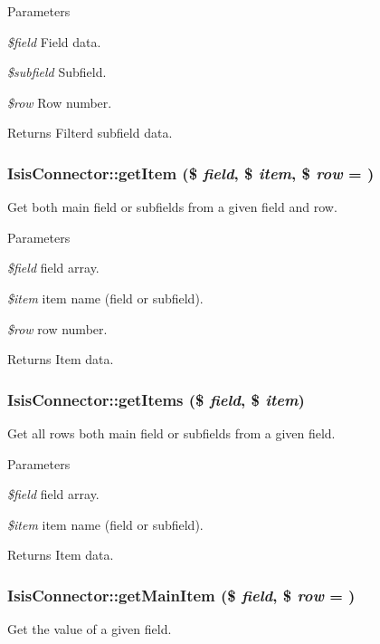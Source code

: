 \begin{DoxyParams}{Parameters}
\item[{\em \$field}]Field data.\item[{\em \$subfield}]Subfield.\item[{\em \$row}]Row number.\end{DoxyParams}
\begin{DoxyReturn}{Returns}
Filterd subfield data. 
\end{DoxyReturn}
\hypertarget{classIsisConnector_aa16bb24a54837048eee6244957cbf091}{
\subsubsection[{getItem}]{\setlength{\rightskip}{0pt plus 5cm}IsisConnector::getItem (\$ {\em field}, \/  \$ {\em item}, \/  \$ {\em row} = {})}}
\label{classIsisConnector_aa16bb24a54837048eee6244957cbf091}
Get both main field or subfields from a given field and row.


\begin{DoxyParams}{Parameters}
\item[{\em \$field}]field array.\item[{\em \$item}]item name (field or subfield).\item[{\em \$row}]row number.\end{DoxyParams}
\begin{DoxyReturn}{Returns}
Item data. 
\end{DoxyReturn}
\hypertarget{classIsisConnector_aa928456a26e0264bf0c1a4869a02cbb3}{
\subsubsection[{getItems}]{\setlength{\rightskip}{0pt plus 5cm}IsisConnector::getItems (\$ {\em field}, \/  \$ {\em item})}}
\label{classIsisConnector_aa928456a26e0264bf0c1a4869a02cbb3}
Get all rows both main field or subfields from a given field.


\begin{DoxyParams}{Parameters}
\item[{\em \$field}]field array.\item[{\em \$item}]item name (field or subfield).\end{DoxyParams}
\begin{DoxyReturn}{Returns}
Item data. 
\end{DoxyReturn}
\hypertarget{classIsisConnector_a21c7c4e9fec2440f8c7d36f8a632c8c2}{
\subsubsection[{getMainItem}]{\setlength{\rightskip}{0pt plus 5cm}IsisConnector::getMainItem (\$ {\em field}, \/  \$ {\em row} = {})}}
\label{classIsisConnector_a21c7c4e9fec2440f8c7d36f8a632c8c2}
Get the value of a given field.



